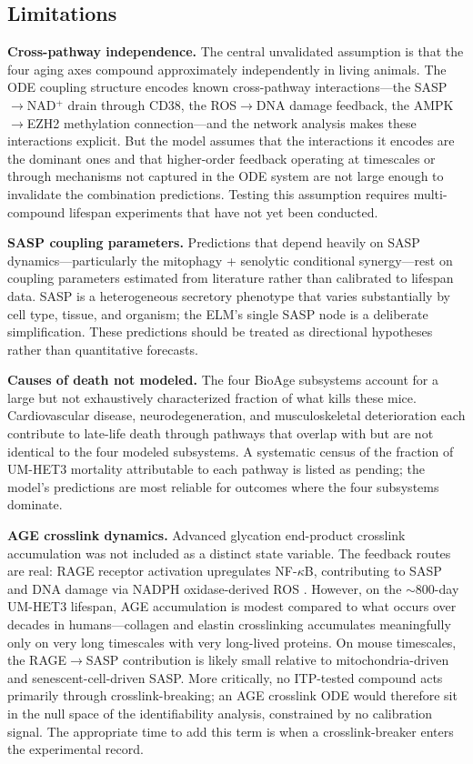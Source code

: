 \documentclass[11pt]{article}
\begin{document}
\subsection{Limitations}

\textbf{Cross-pathway independence.} The central unvalidated assumption is that the four aging axes compound approximately independently in living animals. The ODE coupling structure encodes known cross-pathway interactions---the SASP$\to$NAD$^+$ drain through CD38, the ROS$\to$DNA damage feedback, the AMPK$\to$EZH2 methylation connection---and the network analysis makes these interactions explicit. But the model assumes that the interactions it encodes are the dominant ones and that higher-order feedback operating at timescales or through mechanisms not captured in the ODE system are not large enough to invalidate the combination predictions. Testing this assumption requires multi-compound lifespan experiments that have not yet been conducted.

\textbf{SASP coupling parameters.} Predictions that depend heavily on SASP dynamics---particularly the mitophagy + senolytic conditional synergy---rest on coupling parameters estimated from literature rather than calibrated to lifespan data. SASP is a heterogeneous secretory phenotype that varies substantially by cell type, tissue, and organism; the ELM's single SASP node is a deliberate simplification. These predictions should be treated as directional hypotheses rather than quantitative forecasts.

\textbf{Causes of death not modeled.} The four BioAge subsystems account for a large but not exhaustively characterized fraction of what kills these mice. Cardiovascular disease, neurodegeneration, and musculoskeletal deterioration each contribute to late-life death through pathways that overlap with but are not identical to the four modeled subsystems. A systematic census of the fraction of UM-HET3 mortality attributable to each pathway is listed as pending; the model's predictions are most reliable for outcomes where the four subsystems dominate.

\textbf{AGE crosslink dynamics.} Advanced glycation end-product crosslink accumulation was not included as a distinct state variable. The feedback routes are real: RAGE receptor activation upregulates NF-$\kappa$B, contributing to SASP and DNA damage via NADPH oxidase-derived ROS \citep{Soldatos2006}. However, on the $\sim$800-day UM-HET3 lifespan, AGE accumulation is modest compared to what occurs over decades in humans---collagen and elastin crosslinking accumulates meaningfully only on very long timescales with very long-lived proteins. On mouse timescales, the RAGE$\to$SASP contribution is likely small relative to mitochondria-driven and senescent-cell-driven SASP. More critically, no ITP-tested compound acts primarily through crosslink-breaking; an AGE crosslink ODE would therefore sit in the null space of the identifiability analysis, constrained by no calibration signal. The appropriate time to add this term is when a crosslink-breaker enters the experimental record.
\end{document}
